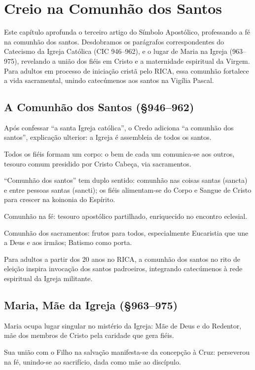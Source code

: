 \chapter{Creio na Comunhão dos Santos}

Este capítulo aprofunda o terceiro artigo do Símbolo Apostólico, professando a fé na comunhão dos santos. Desdobramos os parágrafos correspondentes do Catecismo da Igreja Católica (CIC 946--962), e o lugar de Maria na Igreja (963--975), revelando a união dos fiéis em Cristo e a maternidade espiritual da Virgem. Para adultos em processo de iniciação cristã pelo RICA, essa comunhão fortalece a vida sacramental, unindo catecúmenos aos santos na Vigília Pascal.

\section{A Comunhão dos Santos (\S 946--962)}

Após confessar ``a santa Igreja católica'', o Credo adiciona ``a comunhão dos santos'', explicação ulterior: a Igreja é assembleia de todos os santos.

Todos os fiéis formam um corpo: o bem de cada um comunica-se aos outros, tesouro comum presidido por Cristo Cabeça, via sacramentos.

``Comunhão dos santos'' tem duplo sentido: comunhão nas coisas santas (sancta) e entre pessoas santas (sancti); os fiéis alimentam-se do Corpo e Sangue de Cristo para crescer na koinonia do Espírito.

Comunhão na fé: tesouro apostólico partilhado, enriquecido no encontro eclesial.

Comunhão dos sacramentos: frutos para todos, especialmente Eucaristia que une a Deus e aos irmãos; Batismo como porta.

Para adultos a partir dos 20 anos no RICA, a comunhão dos santos no rito de eleição inspira invocação dos santos padroeiros, integrando catecúmenos à rede espiritual da Igreja militante.

\section{Maria, Mãe da Igreja (\S 963--975)}

Maria ocupa lugar singular no mistério da Igreja: Mãe de Deus e do Redentor, mãe dos membros de Cristo pela caridade que gera fiéis.

Sua união com o Filho na salvação manifesta-se da concepção à Cruz: perseverou na fé, unindo-se ao sacrifício, dada como mãe ao discípulo.


